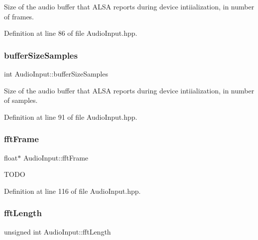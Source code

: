 Size of the audio buffer that A\+L\+SA reports during device intiialization, in number of frames. 

Definition at line 86 of file Audio\+Input.\+hpp.

\mbox{\label{classAudioInput_a4e213a9a22a62dccc3a54369101559c7}} 
\subsubsection{\texorpdfstring{buffer\+Size\+Samples}{bufferSizeSamples}}
{\footnotesize\ttfamily int Audio\+Input\+::buffer\+Size\+Samples\hspace{0.3cm}{\ttfamily [protected]}}

Size of the audio buffer that A\+L\+SA reports during device intiialization, in number of samples. 

Definition at line 91 of file Audio\+Input.\+hpp.

\mbox{\label{classAudioInput_a0c0e5c44a1547a97564e0733aaac2dc0}} 
\subsubsection{\texorpdfstring{fft\+Frame}{fftFrame}}
{\footnotesize\ttfamily float$\ast$ Audio\+Input\+::fft\+Frame\hspace{0.3cm}{\ttfamily [protected]}}

T\+O\+DO 

Definition at line 116 of file Audio\+Input.\+hpp.

\mbox{\label{classAudioInput_a5b31598e9106da62d86d11d69a9dbd20}} 
\subsubsection{\texorpdfstring{fft\+Length}{fftLength}}
{\footnotesize\ttfamily unsigned int Audio\+Input\+::fft\+Length\hspace{0.3cm}{\ttfamily [protected]}}

